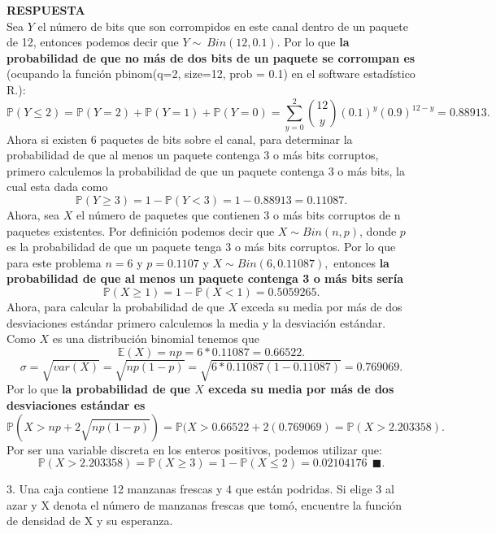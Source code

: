 \documentclass[11pt,letterpaper]{article}
\newcommand{\mP}{\mathbb{P}}
\newcommand{\mE}{\mathbb{E}}
\newcommand{\res}{\textbf{RESPUESTA}\\}
\newcommand{\finf}{\blacksquare.}
\begin{document}
\begin{itemize}
\res
Sea $Y$ el número de bits que son corrompidos en este canal dentro de un paquete de 12, entonces podemos decir que $Y\sim \ Bin(12,0.1)$. Por lo que \textbf{la probabilidad de que no más de dos bits de un paquete se corrompan es} (ocupando la función \textsf{pbinom(q=2, size=12, prob = 0.1)} en el software estadístico R.):
$$\mP(Y\leq2)= \mP(Y=2)+\mP(Y=1)+\mP(Y=0)=\sum_{y=0}^2{12 \choose y}(0.1)^y(0.9)^{12-y}=0.88913.$$
Ahora si existen 6 paquetes de bits sobre el canal, para determinar la probabilidad de que al menos un paquete contenga 3 o más bits corruptos, primero calculemos la probabilidad de que un paquete contenga 3 o más bits, la cual esta dada como 
$$\mP(Y\geq3) = 1-\mP(Y<3)=1-0.88913= 0.11087.$$
Ahora, sea $X$ el número de paquetes que contienen 3 o más bits corruptos de n paquetes existentes. Por definición podemos decir que $X\sim Bin(n,p)$, donde $p$ es la probabilidad de que un paquete tenga 3 o más bits corruptos. Por lo que para este problema $n=6$ y $p=0.1107$ y $X\sim Bin(6,0.11087),$ entonces \textbf{la probabilidad de que al menos un paquete contenga 3 o más bits sería}
$$\mP(X\geq1)=1-\mP(X<1)=0.5059265.$$
Ahora, para calcular la probabilidad de que $X$ exceda su media por más de dos desviaciones estándar primero calculemos la media y la desviación estándar. Como $X$ es una distribución binomial tenemos que 
$$\mE(X)=np=6*0.11087=0.66522.$$
$$\sigma=\sqrt{var(X)} =\sqrt{np(1-p)}=\sqrt{6*0.11087(1-0.11087)}=0.769069.$$
Por lo que \textbf{la probabilidad de que $X$ exceda su media por más de dos desviaciones estándar es}
$$\mP(X>np+2\sqrt{np(1-p)})=\mP(X>0.66522+2(0.769069)=\mP(X> 2.203358).$$
Por ser una variable discreta en los enteros positivos, podemos utilizar que:
$$\mP(X> 2.203358)=\mP (X\geq 3)=1-\mP(X\leq2)=0.02104176 \ \ \finf$$

3. Una caja contiene 12 manzanas frescas y 4 que están podridas. Si elige 3 al azar y X denota el
número de manzanas frescas que tomó, encuentre la función de densidad de X y su esperanza.


\end{itemize}
\end{document}
